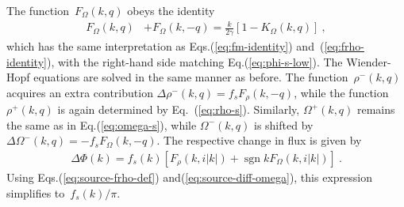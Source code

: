 \documentclass[preprint,aps,eqsecnum, prb]{revtex4-1}
\newcommand{\fplus}[1]{{#1}^{+}}
\newcommand{\fminus}[1]{{#1}^{-}}
\renewcommand{\Im}{\mathop{\mathrm{Im}}\nolimits}
\newcommand{\sgn}{\mathop{\mathrm{sgn}}\nolimits}
\begin{document}
The function~$F_\Omega(k, q)$ obeys the identity
\begin{align}
\label{eq:fomega-identity}
F_\Omega(k, q) & + F_\Omega(k, -q)
        = \frac{k}{2\gamma} \left[1 - K_\Omega(k, q)\right]
\ ,
\end{align}
which has the same interpretation as Eqs.(\ref{eq:fm-identity})
and~(\ref{eq:frho-identity}), with the right-hand side
matching Eq.(\ref{eq:phi-s-low}).
The Wiender-Hopf equations are solved in the same manner as before.
The function~$\fminus{\rho}(k, q)$ acquires an extra contribution
$\Delta \fminus{\rho}(k, q) = f_s F_\rho(k, -q)$, while
the function~$\fplus{\rho}(k, q)$ is again determined
by Eq.~(\ref{eq:rho-s}). Similarly, $\fplus{\Omega}(k, q)$
remains the same as in Eq.(\ref{eq:omega-s}),
while $\fminus{\Omega}(k, q)$
is shifted by~$\Delta\fminus{\Omega}(k, q) = - f_s F_\Omega(k, -q)$.
The respective change in flux is given by
\begin{align}
\Delta \Phi(k)
= f_s(k) \left[F_\rho(k, i|k|) + \sgn k F_\Omega(k, i|k|)\right]
\ .
\end{align}
Using Eqs.(\ref{eq:source-frho-def})
and(\ref{eq:source-diff-omega}),
this expression simplifies to~$f_s(k) / \pi$.



\end{document}
